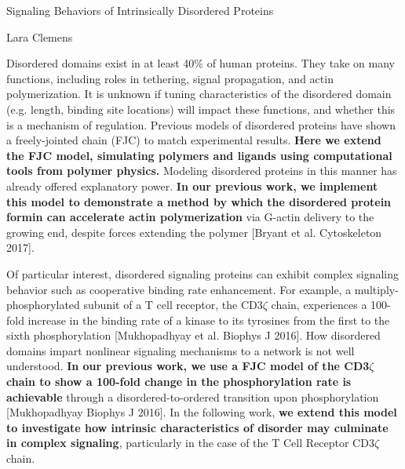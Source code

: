 \documentclass[onecolumn]{article}
\begin{document}
\newcommand{\citel}[1]{\citep{#1}}
\newcommand{\citelt}[1]{\citet{#1}}

\def\Tevac{T_{1/2}^{\mbox{\,\scriptsize evac}}}
\def\Treturn{T_{1/2}^{\mbox{\,\scriptsize return}}}
\def\toffbar{\bar{t}_{\mbox{\scriptsize off}}}
\def\toff{{t}_{\mbox{\scriptsize off}}}
\def\Peclet{P\'{e}clet}


\begin{center}
\Large
Signaling Behaviors of Intrinsically Disordered Proteins

\large
Lara Clemens
\date{}

\end{center}
\normalsize


Disordered domains exist in at least 40\% of human proteins. 
They take on many functions, including roles in tethering, signal propagation, and actin polymerization. 
It is unknown if tuning characteristics of the disordered domain (e.g. length, binding site locations) will impact these functions, and whether this is a mechanism of regulation. 
Previous models of disordered proteins have shown a freely-jointed chain (FJC) to match experimental results. 
\textbf{Here we extend the FJC model, simulating polymers and ligands using computational tools from polymer physics. }
Modeling disordered proteins in this manner has already offered explanatory power. \textbf{In our previous work, we implement this model to demonstrate a method by which the disordered protein formin can accelerate actin polymerization} via G-actin delivery to the growing end, despite forces extending the polymer [Bryant et al. Cytoskeleton 2017]. 

Of particular interest, disordered signaling proteins can exhibit complex signaling behavior such as cooperative binding rate enhancement. For example, a multiply-phosphorylated subunit of a T cell receptor, the CD3$\zeta$ chain, experiences a 100-fold increase in the binding rate of a kinase to its tyrosines from the first to the sixth phosphorylation [Mukhopadhyay et al. Biophys J 2016]. How disordered domains impart nonlinear signaling mechanisms to a network is not well understood. \textbf{In our previous work, we use a FJC model of the CD3$\zeta$ chain to show a 100-fold change in the phosphorylation rate is achievable} through a disordered-to-ordered transition upon phosphorylation [Mukhopadhyay Biophys J 2016]. In the following work, \textbf{we extend this model to investigate how intrinsic characteristics of disorder may culminate in complex signaling}, particularly in the case of the T Cell Receptor CD3$\zeta$ chain.
\end{document}
